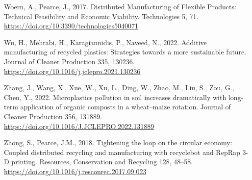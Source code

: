 \documentclass[12pt]{elsarticle} %
\newlength{\cslhangindent}
\newlength{\cslentryspacingunit} %
\newenvironment{CSLReferences}[2] %
 {%
  \setlength{\parindent}{0pt}
  \ifodd #1
  \let\oldpar\par
  \def\par{\hangindent=\cslhangindent\oldpar}
  \fi
  \setlength{\parskip}{#2\cslentryspacingunit}
 }%
 {}
\begin{document}
\begin{CSLReferences}{1}{0}
\leavevmode{}%
Woern, A., Pearce, J., 2017. Distributed {Manufacturing} of {Flexible Products}: {Technical Feasibility} and {Economic Viability}. Technologies 5, 71. \url{https://doi.org/10.3390/technologies5040071}

\leavevmode{}%
Wu, H., Mehrabi, H., Karagiannidis, P., Naveed, N., 2022. Additive manufacturing of recycled plastics: {Strategies} towards a more sustainable future. Journal of Cleaner Production 335, 130236. \url{https://doi.org/10.1016/j.jclepro.2021.130236}

\leavevmode{}%
Zhang, J., Wang, X., Xue, W., Xu, L., Ding, W., Zhao, M., Liu, S., Zou, G., Chen, Y., 2022. Microplastics pollution in soil increases dramatically with long-term application of organic composts in a wheat--maize rotation. Journal of Cleaner Production 356, 131889. \url{https://doi.org/10.1016/J.JCLEPRO.2022.131889}

\leavevmode{}%
Zhong, S., Pearce, J.M., 2018. Tightening the loop on the circular economy: {Coupled} distributed recycling and manufacturing with recyclebot and {RepRap} 3-{D} printing. Resources, Conservation and Recycling 128, 48--58. \url{https://doi.org/10.1016/j.resconrec.2017.09.023}

\end{CSLReferences}

\newpage

\appendix


\end{document}
